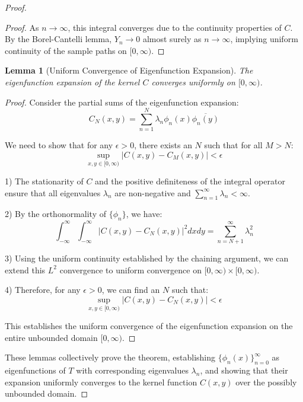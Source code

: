 \documentclass{article}
\newtheorem{lemma}[theorem]{Lemma}
\begin{document}
\begin{proof}
\begin{proof}
As $n \to \infty$, this integral converges due to the continuity properties of $C$. By the Borel-Cantelli lemma, $Y_n \to 0$ almost surely as $n \to \infty$, implying uniform continuity of the sample paths on $[0,\infty)$.
\end{proof}

\begin{lemma}[Uniform Convergence of Eigenfunction Expansion]
The eigenfunction expansion of the kernel $C$ converges uniformly on $[0,\infty)$.
\end{lemma}

\begin{proof}
Consider the partial sums of the eigenfunction expansion:
\[
C_N(x,y) = \sum_{n=1}^N \lambda_n \phi_n(x) \overline{\phi_n(y)}
\]

We need to show that for any $\epsilon > 0$, there exists an $N$ such that for all $M > N$:
\[
\sup_{x,y \in [0,\infty)} |C(x,y) - C_M(x,y)| < \epsilon
\]

1) The stationarity of $C$ and the positive definiteness of the integral operator ensure that all eigenvalues $\lambda_n$ are non-negative and $\sum_{n=1}^\infty \lambda_n < \infty$.

2) By the orthonormality of $\{\phi_n\}$, we have:
   \[
   \int_{-\infty}^\infty \int_{-\infty}^\infty |C(x,y) - C_N(x,y)|^2 dx dy = \sum_{n=N+1}^\infty \lambda_n^2
   \]

3) Using the uniform continuity established by the chaining argument, we can extend this $L^2$ convergence to uniform convergence on $[0,\infty) \times [0,\infty)$.

4) Therefore, for any $\epsilon > 0$, we can find an $N$ such that:
   \[
   \sup_{x,y \in [0,\infty)} |C(x,y) - C_N(x,y)| < \epsilon
   \]

This establishes the uniform convergence of the eigenfunction expansion on the entire unbounded domain $[0,\infty)$.
\end{proof}

These lemmas collectively prove the theorem, establishing $\{\phi_n(x)\}_{n=0}^{\infty}$ as eigenfunctions of $T$ with corresponding eigenvalues $\lambda_n$, and showing that their expansion uniformly converges to the kernel function $C(x,y)$ over the possibly unbounded domain.
\end{proof}
\end{document}
